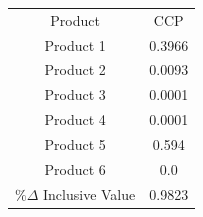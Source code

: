 \begin{tabular}{cc}
Product & CCP \\
Product 1 & 0.3966 \\
Product 2 & 0.0093 \\
Product 3 & 0.0001 \\
Product 4 & 0.0001 \\
Product 5 & 0.594 \\
Product 6 & 0.0 \\
$\%\Delta$ Inclusive Value & 0.9823 \\
\end{tabular}